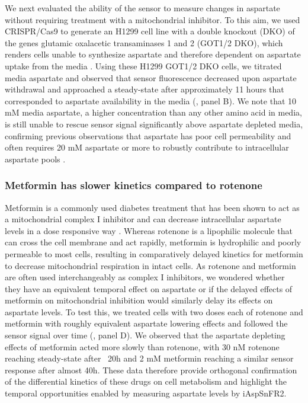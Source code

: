 \documentclass[9pt,lineno]{elife}
\begin{document}
We next evaluated the ability of the sensor to measure changes in aspartate without requiring treatment with a mitochondrial inhibitor.
To this aim, we used CRISPR/Cas9 to generate an H1299 cell line with a double knockout (DKO) of the genes glutamic oxalacetic transaminases 1 and 2 (GOT1/2 DKO), which renders cells unable to synthesize aspartate and therefore dependent on aspartate uptake from the media \citep{Garcia-Bermudez2022-qn}.
Using these H1299 GOT1/2 DKO cells, we titrated media aspartate and observed that sensor fluorescence decreased upon aspartate withdrawal and approached a steady-state after approximately 11 hours that corresponded to aspartate availability in the media (, panel B).
We note that 10 mM media aspartate, a higher concentration than any other amino acid in media, is still unable to rescue sensor signal significantly above aspartate depleted media, confirming previous observations that aspartate has poor cell permeability and often requires 20 mM aspartate or more to robustly contribute to intracellular aspartate pools \citep{Sullivan2018-gz}.


\subsubsection{Metformin has slower kinetics compared to rotenone}
Metformin is a commonly used diabetes treatment that has been shown to act as a mitochondrial complex I inhibitor \citep{Owen2000-ri, El-Mir2000-qm, Andrzejewski2014-wm, Wheaton2014-ka} and can decrease intracellular aspartate levels in a dose responsive way \citep{Gui2016-ca}.
Whereas rotenone is a lipophilic molecule that can cross the cell membrane and act rapidly, metformin is hydrophilic and poorly permeable to most cells, resulting in comparatively delayed kinetics for metformin to decrease mitochondrial respiration in intact cells.
As rotenone and metformin are often used interchangeably as complex I inhibitors, we wondered whether they have an equivalent temporal effect on aspartate or if the delayed effects of metformin on mitochondrial inhibition would similarly delay its effects on aspartate levels.
To test this, we treated cells with two doses each of rotenone and metformin with roughly equivalent aspartate lowering effects and followed the sensor signal over time (, panel D).
We observed that the aspartate depleting effects of metformin acted more slowly than rotenone, with 30 nM rotenone reaching steady-state after ~20h and 2 mM metformin reaching a similar sensor response after almost 40h.
These data therefore provide orthogonal confirmation of the differential kinetics of these drugs on cell metabolism and highlight the temporal opportunities enabled by measuring aspartate levels by iAspSnFR2.
\end{document}
